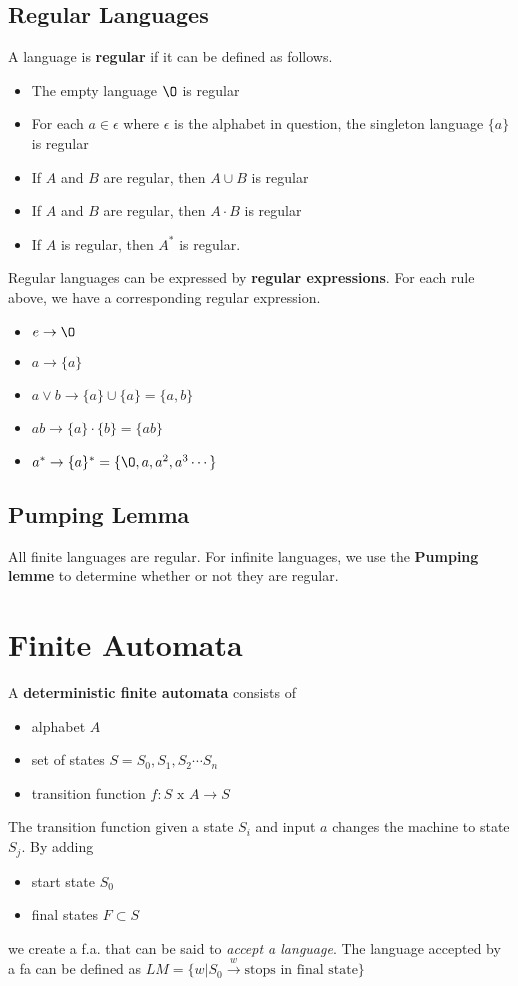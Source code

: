 \documentclass{article}
\begin{document}
		\subsection{Regular Languages} \label{reglangs}
		A language is \textbf{regular} if it can be defined as follows.
		\begin{itemize}
			\item The empty language $\O$ is regular
			\item For each $a \in \epsilon$ where $\epsilon$ is the alphabet in question, the singleton language $\{a\}$ is regular
			\item If $A$ and $B$ are regular, then $A \cup B$ is regular
			\item If $A$ and $B$ are regular, then $A \cdot B$ is regular
			\item If $A$ is regular, then $A^*$ is regular.
		\end{itemize}
		Regular languages can be expressed by \textbf{regular expressions}. For each rule above, we have a corresponding regular expression.
		\begin{itemize}
			\item $e \rightarrow \O$
			\item $a \rightarrow \{a\}$
			\item $a \lor b \rightarrow \{a\} \cup \{a\} = \{a,b\}$
			\item $ab \rightarrow \{a\} \cdot \{b\} = \{ab\}$
			\item $a^* \rightarrow \{a\}^* = \{\O,a,a^2,a^3 \cdots \}$ 
		\end{itemize}
		\subsection{Pumping Lemma}
		All finite languages are regular. For infinite languages, we use the \textbf{Pumping lemme} to determine whether or not they are regular.
	\section{Finite Automata}
		A \textbf{deterministic finite automata} consists of
		\begin{itemize}
			\item alphabet $A$
			\item set of states $S = S_0,S_1,S_2 \cdots S_n$
			\item transition function $f : S \text{ x } A \rightarrow S$
		\end{itemize}
		The transition function given a state $S_i$ and input $a$ changes the machine to state $S_j$. By adding
		\begin{itemize}
			\item start state $S_0$
			\item final states $F \subset S$
		\end{itemize}
		we create a f.a. that can be said to \emph{accept a language}. The language accepted by a fa can be defined as $LM = \{w | S_0  \overset{w}{\rightarrow} \text{stops in final state}\}$
\end{document}
